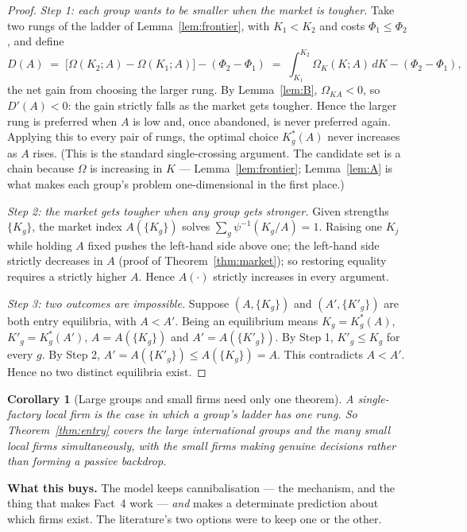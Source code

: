 \documentclass[11pt]{article}
\newenvironment{keypoint}
  {\begin{lrbox}{\kbox}\begin{minipage}{0.93\textwidth}\vspace{3pt}}
  {\vspace{3pt}\end{minipage}\end{lrbox}\begin{center}\fbox{\usebox{\kbox}}\end{center}}
\theoremstyle{plain}
\newtheorem{corollary}{Corollary}
\theoremstyle{remark}
\theoremstyle{definition}
\begin{document}
\begin{proof}
\emph{Step 1: each group wants to be smaller when the market is tougher.} Take two
rungs of the ladder of Lemma~\ref{lem:frontier}, with $K_1<K_2$ and costs
$\Phi_1\le\Phi_2$, and define
\[
  D(A)\;=\;\bigl[\Omega(K_2;A)-\Omega(K_1;A)\bigr]-(\Phi_2-\Phi_1)
  \;=\;\int_{K_1}^{K_2}\Omega_K(K;A)\,dK-(\Phi_2-\Phi_1),
\]
the net gain from choosing the larger rung. By Lemma~\ref{lem:B}, $\Omega_{KA}<0$, so
$D'(A)<0$: the gain strictly falls as the market gets tougher. Hence the larger rung
is preferred when $A$ is low and, once abandoned, is never preferred again. Applying
this to every pair of rungs, the optimal choice $K^{*}_g(A)$ never increases as $A$
rises. (This is the standard single-crossing argument. The candidate set is a chain
because $\Omega$ is increasing in $K$ --- Lemma~\ref{lem:frontier}; Lemma~\ref{lem:A}
is what makes each group's problem one-dimensional in the first place.)

\emph{Step 2: the market gets tougher when any group gets stronger.} Given strengths
$\{K_g\}$, the market index $A(\{K_g\})$ solves $\sum_g\psi^{-1}(K_g/A)=1$. Raising one
$K_j$ while holding $A$ fixed pushes the left-hand side above one; the left-hand side
strictly decreases in $A$ (proof of Theorem~\ref{thm:market}); so restoring equality
requires a strictly higher $A$. Hence $A(\cdot)$ strictly increases in every argument.

\emph{Step 3: two outcomes are impossible.} Suppose $(A,\{K_g\})$ and
$(A',\{K'_g\})$ are both entry equilibria, with $A<A'$. Being an equilibrium means
$K_g=K^{*}_g(A)$, $K'_g=K^{*}_g(A')$, $A=A(\{K_g\})$ and $A'=A(\{K'_g\})$. By Step 1,
$K'_g\le K_g$ for every $g$. By Step 2, $A'=A(\{K'_g\})\le A(\{K_g\})=A$. This
contradicts $A<A'$. Hence no two distinct equilibria exist.
\end{proof}

\begin{corollary}[Large groups and small firms need only one theorem]\label{cor:tiers}
A single-factory local firm is the case in which a group's ladder has one rung. So
Theorem~\ref{thm:entry} covers the large international groups and the many small local
firms simultaneously, with the small firms making genuine decisions rather than
forming a passive backdrop.
\end{corollary}

\begin{keypoint}
\textbf{What this buys.} The model keeps cannibalisation --- the mechanism, and the
thing that makes Fact~4 work --- \emph{and} makes a determinate prediction about which
firms exist. The literature's two options were to keep one or the other.
\end{keypoint}
\end{document}
